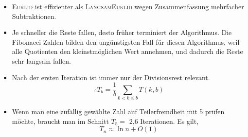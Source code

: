 \documentclass[12pt]{article}
\begin{document}
\begin{itemize}
	\vspace{10pt}
	\item \textsc{Euklid} ist effizienter als \textsc{LangsamEuklid} wegen Zusammenfassung mehrfacher Subtraktionen.
	\item Je schneller die Reste fallen, desto fr\"uher terminiert der Algorithmus. Die Fibonacci-Zahlen bilden den ung\"unstigsten Fall f\"ur diesen Algorithmus, weil alle Quotienten den kleinstm\"oglichen Wert annehmen, und dadurch die Reste sehr langsam fallen.
	\item Nach der ersten Iteration ist immer nur der Divisionsrest relevant.
	$$\therefore T_{b} = \frac{1}{b} \sum_{0 < k\leq b} T(k,b)$$
	\item Wenn man eine zuf\"allig gew\"ahlte Zahl auf Teilerfremdheit mit 5 pr\"ufen m\"ochte, braucht man im Schnitt $T_5=$ 2,6 Iterationen. Es gilt,
	$$T_n \approx \ln{n} + O(1)$$
\end{itemize}
\end{document}
